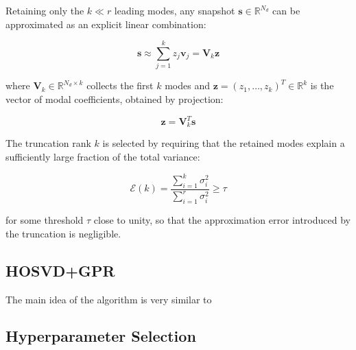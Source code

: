 Retaining only the $k \ll r$ leading modes, any snapshot $\mathbf{s} \in \mathbb{R}^{N_d}$  can be approximated as an explicit linear combination:

\begin{equation}
    \mathbf{s} \approx \sum_{j=1}^{k} z_j \mathbf{v}_j = \mathbf{V}_k \mathbf{z}
\end{equation}

where $\mathbf{V}_k \in \mathbb{R}^{N_d \times k}$ collects the first $k$ modes and 
$\mathbf{z} = (z_1, \ldots, z_k)^T \in \mathbb{R}^k$ is the vector of modal coefficients, 
obtained by projection:

\begin{equation}
    \mathbf{z} = \mathbf{V}_k^T \mathbf{s}
\end{equation}

The truncation rank $k$ is selected by requiring that the retained modes explain a 
sufficiently large fraction of the total variance:

\begin{equation}
    \mathcal{E}(k) = \frac{\sum_{i=1}^{k} \sigma_i^2}{\sum_{i=1}^{r} \sigma_i^2} \geq \tau
\end{equation}

for some threshold $\tau$ close to unity, so that the approximation error introduced 
by the truncation is negligible.

\subsection{HOSVD+GPR}

The main idea of the algorithm is very similar to 


\subsection{Hyperparameter Selection}

